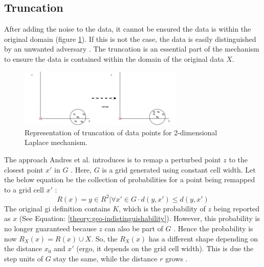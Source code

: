 \subsection{Truncation} \label{theory:truncation}
After adding the noise to the data, it cannot be ensured the data is within the original domain (figure \ref{figure:truncation-2d}).
If this is not the case, the data is easily distinguished by an unwanted adversary \citep{DBLP:journals/corr/abs-1212-1984,9646489}.
The truncation is an essential part of the mechanism to ensure the data is contained within the domain of the original data $X$.
\begin{figure}[H]
\centering
  \includegraphics[width=0.7\textwidth]{TheorethicalFramework/ND-Laplace/Images/remapping.png}
  \caption{Representation of truncation of data points for 2-dimensional Laplace mechanism.}
  \label{figure:truncation-2d}
\end{figure}
The approach Andres et al. introduces is to remap a perturbed point $z$ to the closest point $x'$ in $G$ \citep{DBLP:journals/corr/abs-1212-1984}.
Here, $G$ is a grid generated using constant cell width.
Let the below equation be the collection of probabilities for a point being remapped to a grid cell $x'$ \citep{DBLP:journals/corr/abs-1212-1984}:
\begin{equation}
  R(x) = { y \in R^2 | \forall x' \in G \cdot d(y, x') \leq d(y, x')}
  \label{eq:grid-probability}
\end{equation}
The original \gls{gi} definition contains $K$, which is the probability of $z$ being reported as $x$ (See Equation: \ref{theory:geo-indistinguishability}).
However, this probability is no longer guaranteed because $z$ can also be part of $G$ \citep{DBLP:journals/corr/abs-1212-1984}.
Hence the probability is now $R_X(x) = R(x) \cup X$. \newline
So, the $R_X(x)$ has a different shape depending on the distance $x_0$ and $x'$ (ergo, it depends on the grid cell width). This is due the step units of $G$ stay the same, while the distance $r$ grows \citep{DBLP:journals/corr/abs-1212-1984}.

